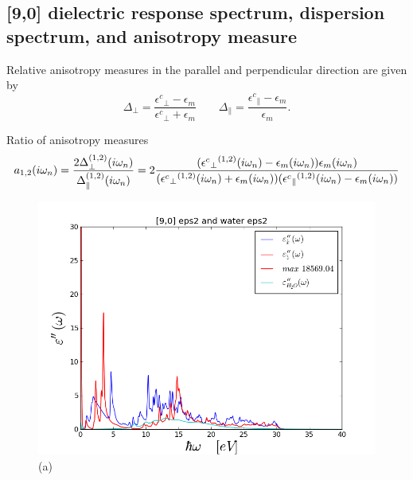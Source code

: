 \documentclass[a4paper]{article}
\begin{document}
\begin{center}
\section{[9,0] dielectric response spectrum, dispersion spectrum, and anisotropy measure}
Relative anisotropy measures in the parallel and perpendicular direction are given by
\begin{equation}
\Delta_{\perp}=\frac{{\epsilon^{c}}_{\perp}-\epsilon_{m}}{{\epsilon^{c}}_{\perp}+\epsilon_{m}}\qquad\Delta_{\parallel}=\frac{{\epsilon^{c}}_{\parallel}-\epsilon_{m}}{\epsilon_{m}}.
\label{anisoind}
\end{equation}

Ratio of anisotropy measures
\begin{equation}
a_{1,2}(i \omega_n) = \frac{2 \Delta_{\perp}^{(1,2)}(i\omega_n)}{\Delta_{\parallel}^{(1,2)}(i \omega_n)} = \\
2 \frac{({{\epsilon^{c}}_{\perp}}^{(1,2)}(i \omega_n) -\epsilon_{m}(i \omega_n)) \epsilon_{m}(i \omega_n)}{({{\epsilon^{c}}_{\perp}}^{(1,2)}(i \omega_n)+\epsilon_{m}(i \omega_n)) ({{\epsilon^{c}}_{\parallel}}^{(1,2)}(i \omega_n) -\epsilon_{m}(i \omega_n))}
    \label{eq:adef}
\end{equation}
\begin{figure}[t!]
\begin{center}
\begin{minipage}[b]{0.40\textwidth}
\begin{center}
\includegraphics[width=1.4\textwidth]{prop_plots/90w90_eps2.png} (a)
\end{center}

\end{minipage}
\end{center}
\end{figure}
\end{center}
\end{document}
